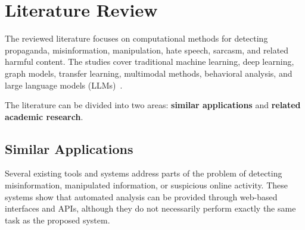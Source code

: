 \documentclass[12pt,a4paper]{report}
\begin{document}
\section{Literature Review}
The reviewed literature focuses on computational methods for detecting propaganda,
misinformation, manipulation, hate speech, sarcasm, and related harmful content.
The studies cover traditional machine learning, deep learning, graph models,
transfer learning, multimodal methods, behavioral analysis, and large language
models (LLMs)~\cite{duridi2025,plikynas2025,ahmad2025,schneider2026}.

The literature can be divided into two areas: \textbf{similar applications} and
\textbf{related academic research}.

\subsection{Similar Applications}
Several existing tools and systems address parts of the problem of detecting
misinformation, manipulated information, or suspicious online activity. These
systems show that automated analysis can be provided through web-based interfaces
and APIs, although they do not necessarily perform exactly the same task as the
proposed system.
\end{document}
